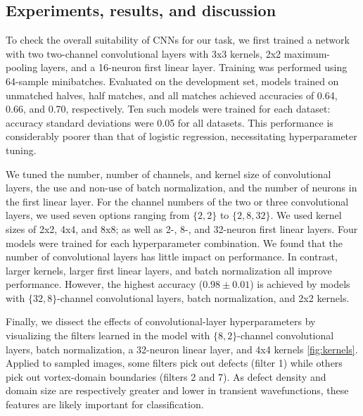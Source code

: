 \documentclass[nofootinbib,pre,superscriptaddress,twocolumn,longbibliography,floatfix]{revtex4-2}
\begin{document}
\subsection{Experiments, results, and discussion}
To check the overall suitability of CNNs for our task, we first trained a network with two two-channel convolutional layers with 3x3 kernels,
2x2 maximum-pooling layers, and a 16-neuron first linear layer.
Training was performed using 64-sample minibatches.
Evaluated on the development set, models trained on unmatched halves, half matches, and all matches achieved accuracies of 0.64, 0.66, and 0.70, respectively.
Ten such models were trained for each dataset: accuracy standard deviations were 0.05 for all datasets.
This performance is considerably poorer than that of logistic regression, necessitating hyperparameter tuning.

We tuned the number, number of channels, and kernel size of convolutional layers,
the use and non-use of batch normalization, and the number of neurons in the first linear layer.
For the channel numbers of the two or three convolutional layers, we used seven options ranging from $\{2, 2\}$ to $\{2, 8, 32\}$.
We used kernel sizes of 2x2, 4x4, and 8x8; as well as 2-, 8-, and 32-neuron first linear layers.
Four models were trained for each hyperparameter combination.
We found that the number of convolutional layers has little impact on performance.
In contrast, larger kernels, larger first linear layers, and batch normalization all improve performance.
However, the highest accuracy ($0.98\pm 0.01$) is achieved by models with $\{32, 8\}$-channel convolutional layers, batch normalization, and 2x2 kernels.


Finally, we dissect the effects of convolutional-layer hyperparameters by visualizing the filters learned in the model with $\{8, 2\}$-channel convolutional layers,
batch normalization, a 32-neuron linear layer, and 4x4 kernels \ref{fig:kernels}.
Applied to sampled images, some filters pick out defects (filter 1) while others pick out vortex-domain boundaries (filters 2 and 7).
As defect density and domain size are respectively greater and lower in transient wavefunctions,
these features are likely important for classification.
\end{document}
